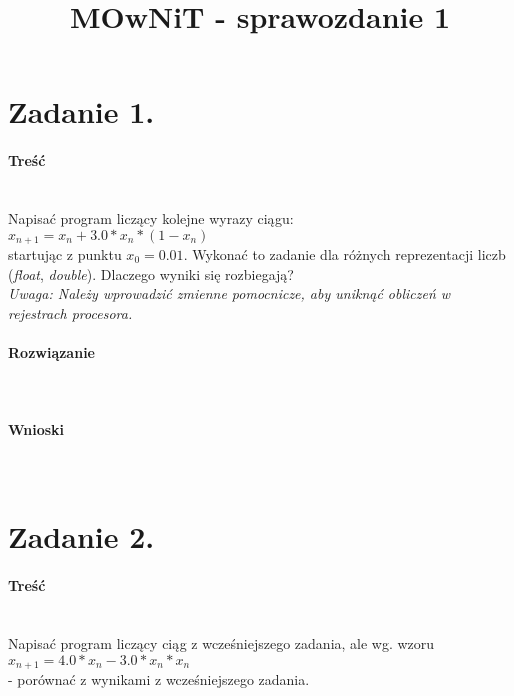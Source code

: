 \documentclass{article}
\title{MOwNiT - sprawozdanie 1}
\begin{document}
  \maketitle
  \thispagestyle{empty}


  \newpage
  \section*{Zadanie 1.} \label{sec:zadanie_1}

  \paragraph{Treść} ~\\
  Napisać program liczący kolejne wyrazy ciągu: \\
  $ x_{n+1} = x_{n} + 3.0 * x_{n} * (1 - x_{n}) $ \\
  startując z punktu $ x_{0} = 0.01 $.
  Wykonać to zadanie dla różnych reprezentacji liczb (\textit{float}, \textit{double}).
  Dlaczego wyniki się rozbiegają? \\
  \textit{Uwaga: Należy wprowadzić zmienne pomocnicze, aby uniknąć obliczeń w rejestrach procesora.} \\

  \paragraph{Rozwiązanie} ~\\
  

  \paragraph{Wnioski} ~\\


  \newpage
  \section*{Zadanie 2.} \label{sec:zadanie_2}

  \paragraph{Treść} ~\\
  Napisać program liczący ciąg z wcześniejszego zadania, ale wg. wzoru \\
  $ x_{n+1} = 4.0 * x_{n} - 3.0 * x_{n} * x_{n} $ \\
  - porównać z wynikami z wcześniejszego zadania. \\
\end{document}
